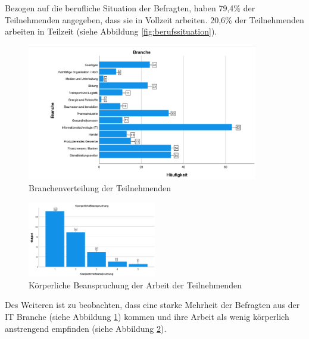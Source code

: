 Bezogen auf die berufliche Situation der Befragten, haben 79,4\% der Teilnehmenden angegeben, dass sie in 
Vollzeit arbeiten. 20,6\% der Teilnehmenden arbeiten in Teilzeit (siehe Abbildung \ref{fig:berufssituation}).

\begin{figure}[h]
    \centering
    \includegraphics[width=0.9\textwidth]{04_Artefakte/01_Abbildungen/deskriptiv_branche.png}
    \caption{Branchenverteilung der Teilnehmenden}
    \label{fig:branche} 
\end{figure}

\begin{figure}[h]
    \centering
    \includegraphics[width=0.5\textwidth]{04_Artefakte/01_Abbildungen/deskriptiv_koerperliche_beanspruchung.png}
    \caption{Körperliche Beanspruchung der Arbeit der Teilnehmenden}
    \label{fig:koerperliche_beanspruchung}
\end{figure}
Des Weiteren ist zu beobachten, dass eine starke Mehrheit der Befragten aus der IT Branche 
(siehe Abbildung \ref{fig:branche}) kommen und ihre Arbeit als wenig körperlich anstrengend empfinden 
(siehe Abbildung \ref{fig:koerperliche_beanspruchung}).

